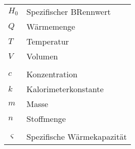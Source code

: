 \begin{table}[h]
    \begin{tabular}{@{}ll@{}}%
        \(H_0\) & Spezifischer BRennwert\\
        \(Q\) & Wärmemenge\\
        \(T\) & Temperatur\\
        \(V\) & Volumen\\
        \(\) & \\
        \(c\) & Konzentration\\
        \(k\) & Kalorimeterkonstante\\
        \(m\) & Masse\\
        \(n\) & Stoffmenge\\
        \(\) & \\
        \(\varsigma\) & Spezifische Wärmekapazität\\
    \end{tabular}
    \label{tab:glossar}
\end{table}